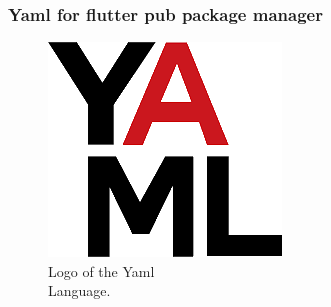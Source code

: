 \newpage
\subsubsection{Yaml for flutter pub package manager}

\begin{figure} %
    \captionsetup{font=footnotesize}
    \centering
    \includegraphics[width=\linewidth]{images/yaml.png}
    \caption{Logo of the Yaml\\Language.}
\end{figure}

